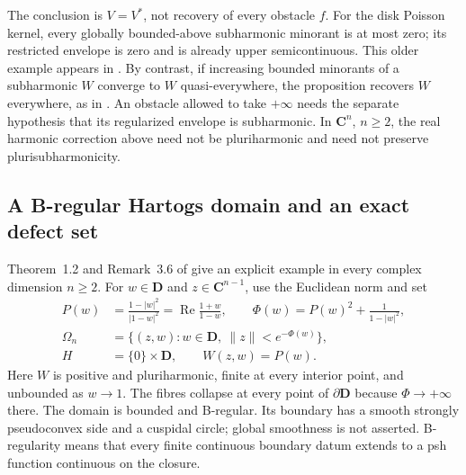 The conclusion is $V=V^*$, not recovery of every obstacle $f$.
For the disk Poisson kernel, every globally bounded-above subharmonic
minorant is at most zero; its restricted envelope is zero and is
already upper semicontinuous. This older example appears in
\cite[Example~1.2, actual p.~1]{NilssonWikstrom20QuasiboundedV1}.
By contrast, if increasing bounded minorants of a subharmonic $W$
converge to $W$ quasi-everywhere, the proposition recovers $W$
everywhere, as in \cite[Corollary~2.1]{Wikstrom26BoundedMinorantsV2}.
An obstacle allowed to take $+\infty$ needs the separate hypothesis
that its regularized envelope is subharmonic. In $\mathbf C^n$, $n\geq2$,
the real harmonic correction above need not be pluriharmonic and need
not preserve plurisubharmonicity.

\subsection{A B-regular Hartogs domain and an exact defect set}
\label{sec:appH-Hartogs-envelope-defect}

Theorem~1.2 and Remark~3.6 of \cite{Wikstrom26BoundedMinorantsV2}
give an explicit example in every complex dimension $n\geq2$.
For $w\in\mathbf D$ and $z\in\mathbf C^{n-1}$, use the Euclidean norm
and set
\begin{equation*}
\begin{aligned}
 P(w)&=\frac{1-|w|^2}{|1-w|^2}
       =\operatorname{Re}\frac{1+w}{1-w},
       \qquad \Phi(w)=P(w)^2+\frac1{1-|w|^2},\\
 \Omega_n&=\{(z,w):w\in\mathbf D,\ \|z\|<e^{-\Phi(w)}\},\\
 H&=\{0\}\times\mathbf D,\qquad W(z,w)=P(w).
\end{aligned}
\tag{H.49}\label{eq:appH-Hartogs-domain}
\end{equation*}
Here $W$ is positive and pluriharmonic, finite at every interior point,
and unbounded as $w\to1$. The fibres collapse at every point of
$\partial\mathbf D$ because $\Phi\to+\infty$ there. The domain is
bounded and B-regular. Its boundary has a smooth strongly pseudoconvex
side and a cuspidal circle; global smoothness is not asserted.
B-regularity means that every finite continuous boundary datum extends
to a psh function continuous on the closure.

